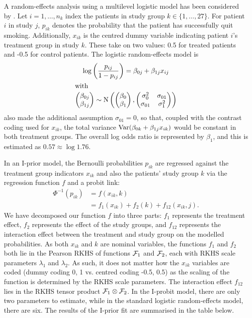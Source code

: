 \documentclass[showframe,11pt]{report}\usepackage[]{graphicx}\usepackage{xcolor}
\begin{document}
A random-effects analysis using a multilevel logistic model has been considered by \citet{agresti2000tutorial}.
Let $i=1,\dots,n_k$ index the patients in study group $k \in \{1,\dots,27\}$.
For patient $i$ in study $j$, $p_{ik}$ denotes the probability that the patient has successfully quit smoking.
Additionally, $x_{ik}$ is the centred dummy variable indicating patient $i$'s treatment group in study $k$.
These take on two values: 0.5 for treated patients and -0.5 for control patients.
The logistic random-effects model is
\begin{gather*}
  \log \left( \frac{p_{ij}}{1-p_{ij}} \right) = \beta_{0j} + \beta_{1j}x_{ij} \\
  \intertext{with}
  \begin{pmatrix} \beta_{0j} \\ \beta_{1j} \end{pmatrix}
  \sim \operatorname{N} \left(
  \begin{pmatrix} \beta_0 \\ \beta_1 \end{pmatrix},
  \begin{pmatrix} \sigma_0^2 & \sigma_{01} \\ \sigma_{01} & \sigma_1^2 \\ \end{pmatrix}
  \right)
\end{gather*}
\citet{agresti2000tutorial} also made the additional assumption $\sigma_{01} = 0$, so that, coupled with the contrast coding used for $x_{ik}$, the total variance $\operatorname{Var}(\beta_{0k} + \beta_{1j}x_{ik})$ would be constant in both treatment groups.
The overall log odds ratio is represented by $\beta_1$, and this is estimated as $0.57 \approx \log 1.76$.

In an I-prior model, the Bernoulli probabilities $p_{ik}$ are regressed against the treatment group indicators $x_{ik}$ and also the patients' study group $k$ via the regression function $f$ and a probit link:
\begin{align*}
  \Phi^{-1}(p_{ik})
  &= f(x_{ik}, k) \\
  &= f_1(x_{ik}) + f_2(k) + f_{12}(x_{ik}, j).
\end{align*}
We have decomposed our function $f$ into three parts: $f_1$ represents the treatment effect, $f_2$ represents the effect of the study groups, and $f_{12}$ represents the interaction effect between the treatment and study group on the modelled probabilities.
As both $x_{ik}$ and $k$ are nominal variables, the functions $f_1$ and $f_2$ both lie in the Pearson RKHS of functions ${\mathcal F}_1$ and ${\mathcal F}_2$, each with RKHS scale parameters $\lambda_1$ and $\lambda_2$.
As such, it does not matter how the $x_{ik}$ variables are coded (dummy coding 0, 1 vs. centred coding -0.5, 0.5) as the scaling of the function is determined by the RKHS scale parameters.
The interaction effect $f_{12}$ lies in the RKHS tensor product ${\mathcal F}_1 \otimes {\mathcal F}_2$.
In the I-probit model, there are only two parameters to estimate, while in the standard logistic random-effects model, there are six.
The results of the I-prior fit are summarised in the table below.
\end{document}
